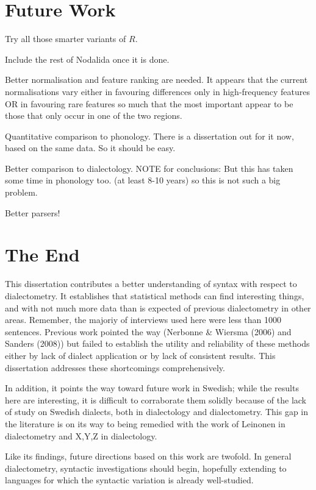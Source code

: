 \section{Future Work}

Try all those smarter variants of $R$.

Include the rest of Nodalida once it is done.

Better normalisation and feature ranking are needed. It appears that
the current normalisations vary either in favouring differences
only in high-frequency features OR in favouring rare features so much
that the most important appear to be those that only occur in one of
the two regions.

Quantitative comparison to phonology. There is a dissertation out for
it now, based on the same data. So it should be easy.

Better comparison to dialectology.
NOTE for conclusions: But this has taken some time in phonology too. (at least 8-10
years) so this is not such a big problem.

Better parsers!

\section{The End}

This dissertation contributes a better understanding of syntax with
respect to dialectometry. It establishes that statistical methods can
find interesting things, and with not much more data than is expected
of previous dialectometry in other areas. Remember, the majoriy of
interviews used here were less than 1000 sentences. Previous work
pointed the way (Nerbonne \& Wiersma (2006) and Sanders (2008)) but
failed to establish the utility and reliability of these methods
either by lack of dialect application or by lack of consistent
results. This dissertation addresses these shortcomings
comprehensively.

In addition, it points the way toward future work in Swedish; while
the results here are interesting, it is difficult to corraborate them
solidly because of the lack of study on Swedish dialects, both in
dialectology and dialectometry. This gap in the literature is on its
way to being remedied with the work of Leinonen in dialectometry and
X,Y,Z in dialectology.

Like its findings, future directions based on this work are
twofold. In general dialectometry, syntactic investigations should
begin, hopefully extending to languages for which the syntactic
variation is already well-studied.

